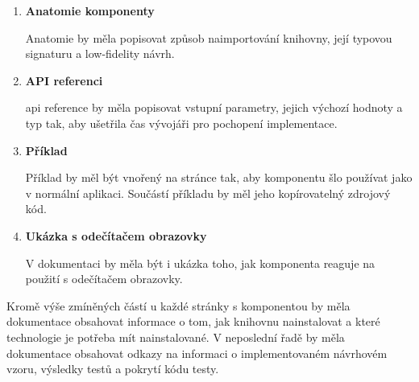 \begin{enumerate}
    \item \textbf{Anatomie komponenty}

          Anatomie by měla popisovat způsob naimportování knihovny, její typovou signaturu a low-fidelity návrh.

    \item \textbf{API referenci}

          \gls{api} reference by měla popisovat vstupní parametry, jejich výchozí hodnoty a typ tak, aby ušetřila čas vývojáři pro pochopení implementace.

    \item \textbf{Příklad}

          Příklad by měl být vnořený na stránce tak, aby komponentu šlo používat jako v normální aplikaci. Součástí příkladu by měl jeho kopírovatelný zdrojový kód.

    \item \textbf{Ukázka s odečítačem obrazovky}

          V dokumentaci by měla být i ukázka toho, jak komponenta reaguje na použití s odečítačem obrazovky.

\end{enumerate}

Kromě výše zmíněných částí u každé stránky s komponentou by měla dokumentace obsahovat informace o tom, jak knihovnu nainstalovat a které technologie je potřeba mít nainstalované.
V neposlední řadě by měla dokumentace obsahovat odkazy na informaci o implementovaném návrhovém vzoru, výsledky testů a pokrytí kódu testy.
